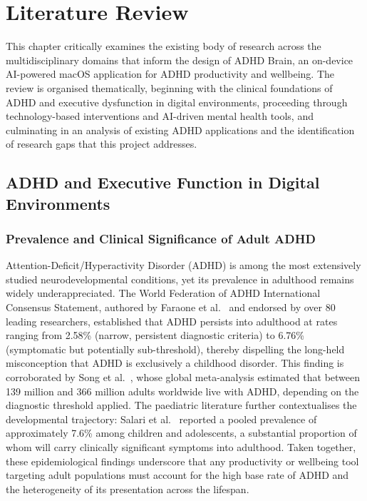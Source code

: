\chapter{Literature Review}
\label{ch:litrev}

This chapter critically examines the existing body of research across the multidisciplinary domains that inform the design of ADHD Brain, an on-device AI-powered macOS application for ADHD productivity and wellbeing. The review is organised thematically, beginning with the clinical foundations of ADHD and executive dysfunction in digital environments, proceeding through technology-based interventions and AI-driven mental health tools, and culminating in an analysis of existing ADHD applications and the identification of research gaps that this project addresses.

\section{ADHD and Executive Function in Digital Environments}
\label{sec:litrev_adhd_ef}

\subsection{Prevalence and Clinical Significance of Adult ADHD}
\label{sec:litrev_prevalence}

Attention-Deficit/Hyperactivity Disorder (ADHD) is among the most extensively studied neurodevelopmental conditions, yet its prevalence in adulthood remains widely underappreciated. The World Federation of ADHD International Consensus Statement, authored by Faraone et al.~\cite{faraone2021} and endorsed by over 80 leading researchers, established that ADHD persists into adulthood at rates ranging from 2.58\% (narrow, persistent diagnostic criteria) to 6.76\% (symptomatic but potentially sub-threshold), thereby dispelling the long-held misconception that ADHD is exclusively a childhood disorder. This finding is corroborated by Song et al.~\cite{song2021}, whose global meta-analysis estimated that between 139 million and 366 million adults worldwide live with ADHD, depending on the diagnostic threshold applied. The paediatric literature further contextualises the developmental trajectory: Salari et al.~\cite{salari2023} reported a pooled prevalence of approximately 7.6\% among children and adolescents, a substantial proportion of whom will carry clinically significant symptoms into adulthood. Taken together, these epidemiological findings underscore that any productivity or wellbeing tool targeting adult populations must account for the high base rate of ADHD and the heterogeneity of its presentation across the lifespan.

